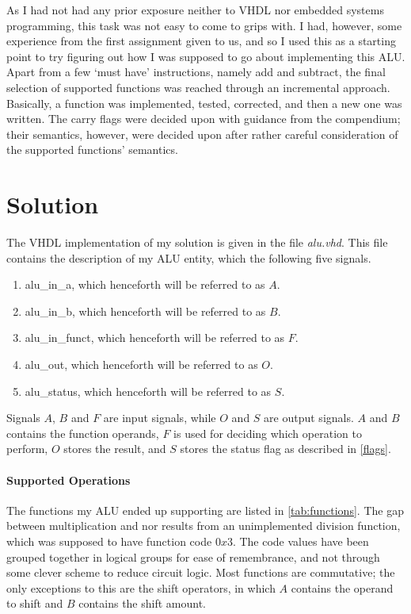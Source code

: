 \documentclass{article}
\begin{document}
As I had not had any prior exposure neither to VHDL nor embedded systems programming, this task was not easy to come to grips with. I had, however, some experience from the first assignment given to us, and so I used this as a starting point to try figuring out how I was supposed to go about implementing this ALU. Apart from a few `must have' instructions, namely add and subtract, the final selection of supported functions was reached through an incremental approach. Basically, a function was implemented, tested, corrected, and then a new one was written. The carry flags were decided upon with guidance from the compendium; their semantics, however, were decided upon after rather careful consideration of the supported functions' semantics. 

\section{Solution}
\label{sec:solution}
The VHDL implementation of my solution is given in the file \emph{alu.vhd}. This file contains the description of my ALU entity, which the following five signals.

\begin{enumerate} 
\item alu\_in\_a, which henceforth will be referred to as $A$.
\item alu\_in\_b, which henceforth will be referred to as $B$.
\item alu\_in\_funct, which henceforth will be referred to as $F$.
\item alu\_out, which henceforth will be referred to as $O$.
\item alu\_status, which henceforth will be referred to as $S$.
\end{enumerate}

Signals $A$, $B$ and $F$ are input signals, while $O$ and $S$ are output signals. $A$ and $B$ contains the function operands, $F$ is used for deciding which operation to perform, $O$ stores the result, and $S$ stores the status flag as described in \autoref{flags}.

\paragraph{Supported Operations}
\label{ops}
The functions my ALU ended up supporting are listed in \autoref{tab:functions}. The gap between multiplication and nor results from an unimplemented division function, which was supposed to have function code $0x3$. The code values have been grouped together in logical groups for ease of remembrance, and not through some clever scheme to reduce circuit logic. Most functions are commutative; the only exceptions to this are the shift operators, in which $A$ contains the operand to shift and $B$ contains the shift amount.
\end{document}

